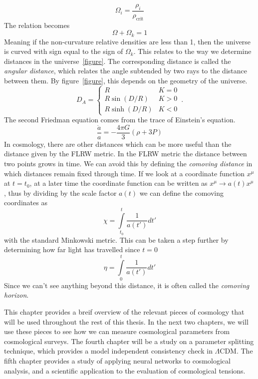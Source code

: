 \begin{equation}
    \Omega_i = \frac{\rho_i}{\rho_\mathrm{crit}}
\end{equation}
The relation becomes
\begin{equation}
    \Omega + \Omega_k = 1 
\end{equation}
Meaning if the non-curvature relative densities are less than 1, then the universe is curved with sign equal to the sign of $\Omega_k$. This relates to the way we determine distances in the universe~\ref{figure}. The corresponding distance is called the \textit{angular distance}, which relates the angle subtended by two rays to the distance between them. By figure~\ref{figure}, this depends on the geometry of the universe.
\begin{equation}
    D_A = \left\{ \begin{array}{cc}
        R & K=0 \\
        R\sin(D/R) & K>0 \\
        R\sinh(D/R) & K<0
    \end{array}
    \right.\,.
\end{equation}
The second Friedman equation comes from the trace of Einstein's equation.
\begin{equation}
    \frac{\ddot a}{a} = -\frac{4\pi G}{3}(\rho + 3P)
\end{equation}
In cosmology, there are other distances which can be more useful than the distance given by the FLRW metric. In the FLRW metric the distance between two points grows in time. 
We can avoid this by defining the \textit{comoving distance} in which distances remain fixed through time. 
If we look at a coordinate function $x^\mu$ at $t=t_0$, at a later time the coordinate function can be written as $x^\mu \rightarrow a(t) x^\mu$, thus by dividing by the scale factor $a(t)$ we can define the comoving coordinates as
\begin{equation}
    \chi = \int\limits^{t}_{t_0} \frac{1}{a(t')} dt'
\end{equation}
with the standard Minkowski metric. This can be taken a step further by determining how far light has travelled since $t=0$
\begin{equation}
    \eta = \int\limits^t_0 \frac{1}{a(t')}dt'
\end{equation}
Since we can't see anything beyond this distance, it is often called the \textit{comoving horizon}. 

This chapter provides a breif overview of the relevant pieces of cosmology that will be used throughout the rest of this thesis. In the next two chapters, we will use these pieces to see how we can measure cosmological parameters from cosmological surveys. The fourth chapter will be a study on a parameter splitting technique, which provides a model independent consistency check in $\Lambda$CDM. The fifth chapter provides a study of applying neural networks to cosmological analysis, and a scientific application to the evaluation of cosmological tensions.

